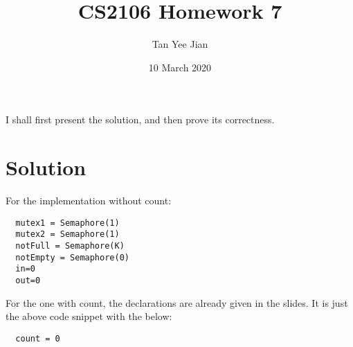 \documentclass[12pt, a4paper]{article}
\title{CS2106 Homework 7}
\author{Tan Yee Jian}
\date{10 March 2020}
\begin{document}
\maketitle

I shall first present the solution, and then prove its correctness.

\section{Solution}
For the implementation without count:
\begin{verbatim}
  mutex1 = Semaphore(1)
  mutex2 = Semaphore(1)
  notFull = Semaphore(K)
  notEmpty = Semaphore(0)
  in=0
  out=0
\end{verbatim}

For the one with count, the declarations are already given in the slides.
It is just the above code snippet with the below:

\begin{verbatim}
  count = 0
\end{verbatim}
\end{document}
